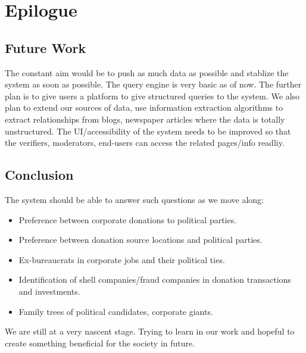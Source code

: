 \chapter{Epilogue}

\section{Future Work}
The constant aim would be to push as much data as possible and stablize the system as soon as possible. The query engine is very basic as of now. The further plan is to give users a platform to give structured queries to the system. We also plan to extend our sources of data, use information extraction algorithms to extract relationships from blogs, newspaper articles where the data is totally unstructured. The UI/accessibility of the system needs to be improved so that the verifiers, moderators, end-users can access the related pages/info readliy. 

\section{Conclusion}

The system should be able to answer such questions as we move along:
\begin{itemize}
\item Preference between corporate donations to political parties.
\item Preference between donation source locations and political parties.
\item Ex-bureaucrats in corporate jobs and their political ties.
\item Identification of shell companies/fraud companies in donation transactions and investments.
\item Family trees of political candidates, corporate giants.
\end{itemize}

We are still at a very nascent stage. Trying to learn in our work and hopeful to create something beneficial for the society in future.
